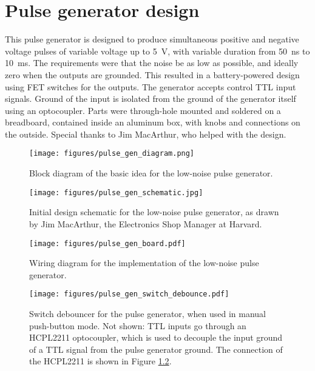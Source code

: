 \chapter{Pulse generator design}
\label{pulse_generator}

This pulse generator is designed to produce simultaneous positive and negative voltage pulses of variable voltage up to \SI{5}{\V}, with variable duration from \SI{50}{\ns} to \SI{10}{\ms}.  The requirements were that the noise be as low as possible, and ideally zero when the outputs are grounded.  This resulted in a battery-powered design using FET switches for the outputs.  The generator accepts control TTL input signals.  Ground of the input is isolated from the ground of the generator itself using an optocoupler.  Parts were through-hole mounted and soldered on a breadboard, contained inside an aluminum box, with knobs and connections on the outside.  Special thanks to Jim MacArthur, who helped with the design.

\begin{figure}[h]
\begin{centering}
\texttt{[image: figures/pulse\_gen\_diagram.png]}
\caption[Pulse generator: block diagram]{Block diagram of the basic idea for the low-noise pulse generator.}
\label{fig:pulse_gen_diagram}
\end{centering}
\end{figure}

\begin{figure}[h]
\begin{centering}
\texttt{[image: figures/pulse\_gen\_schematic.jpg]}
\caption[Pulse generator: schematic]{Initial design schematic for the low-noise pulse generator, as drawn by Jim MacArthur, the Electronics Shop Manager at Harvard.}
\label{fig:pulse_gen_schematic}
\end{centering}
\end{figure}

\begin{figure}[h]
\begin{centering}
\texttt{[image: figures/pulse\_gen\_board.pdf]}
\caption[Pulse generator: circuit wiring diagram]{Wiring diagram for the implementation of the low-noise pulse generator.}
\label{fig:pulse_gen}
\end{centering}
\end{figure}

\begin{figure}[h]
\begin{centering}
\texttt{[image: figures/pulse\_gen\_switch\_debounce.pdf]}
\caption[Pulse generator: switch debouncer]{Switch debouncer for the pulse generator, when used in manual push-button mode.  Not shown: TTL inputs go through an HCPL2211 optocoupler, which is used to decouple the input ground of a TTL signal from the pulse generator ground.  The connection of the HCPL2211 is shown in Figure \ref{fig:pulse_gen_schematic}.}
\label{fig:pulse_gen_debounce}
\end{centering}
\end{figure}
